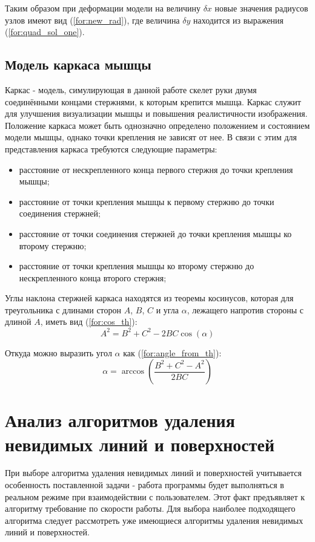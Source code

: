 Таким образом при деформации модели на величину $\delta x$ новые значения радиусов узлов имеют вид (\ref{for:new_rad}), где величина $\delta y$ находится из выражения (\ref{for:quad_sol_one}).

\subsection{Модель каркаса мышцы}

Каркас - модель, симулирующая в данной работе скелет руки двумя соединёнными концами стержнями, к которым крепится мышца. Каркас служит для улучшения визуализации мышцы и повышения реалистичности изображения. Положение каркаса может быть однозначно определено положением и состоянием модели мышцы, однако точки крепления не зависят от нее. В связи с этим для представления каркаса требуются следующие параметры:
\begin{itemize}
    \item расстояние от нескрепленного конца первого стержня до точки крепления мышцы;
    \item расстояние от точки крепления мышцы к первому стержню до точки соединения стержней;
    \item расстояние от точки соединения стержней до точки крепления мышцы ко второму стержню;
    \item расстояние от точки крепления мышцы ко второму стержню до нескрепленного конца второго стержня;
\end{itemize}

Углы наклона стержней каркаса находятся из теоремы косинусов, которая для треугольника с длинами сторон $A$, $B$, $C$ и угла $\alpha$, лежащего напротив стороны с длиной $A$, иметь вид (\ref{for:cos_th}):
\begin{equation}
    \label{for:cos_th}
    A^2 = B^2 + C^2 - 2BC \cos(\alpha)
\end{equation}

Откуда можно выразить угол $\alpha$ как (\ref{for:angle_from_th}):
\begin{equation}
    \label{for:angle_from_th}
    \alpha = \arccos{\left(\frac{B^2 + C^2 - A^2}{2BC}\right)}
\end{equation}

\section{Анализ алгоритмов удаления невидимых линий и поверхностей}

При выборе алгоритма удаления невидимых линий и поверхностей учитывается особенность поставленной задачи - работа программы будет выполняться в реальном режиме при взаимодействии с пользователем. Этот факт предъявляет к алгоритму требование по скорости работы. Для выбора наиболее подходящего алгоритма следует рассмотреть уже имеющиеся алгоритмы удаления невидимых линий и поверхностей.

